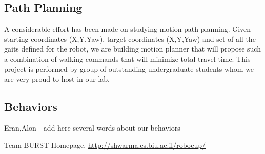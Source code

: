 \documentclass[runningheads,a4paper]{llncs}
\begin{document}
\subsection{Path Planning}
A considerable effort has been made on studying motion path planning. Given starting coordinates (X,Y,Yaw), target coordinates (X,Y,Yaw) and set of all the gaits defined for the robot, we are building motion planner that will propose such a combination of walking commands that will minimize total travel time. This project is performed by group of outstanding undergraduate students whom we are very proud to host in our lab.

\subsection{Behaviors}
Eran,Alon - add here several words about our behaviors

\label{references}


\begin{thebibliography}{4}

 Team BURST Homepage, \url{http://shwarma.cs.biu.ac.il/robocup/}

\end{thebibliography}
\end{document}
